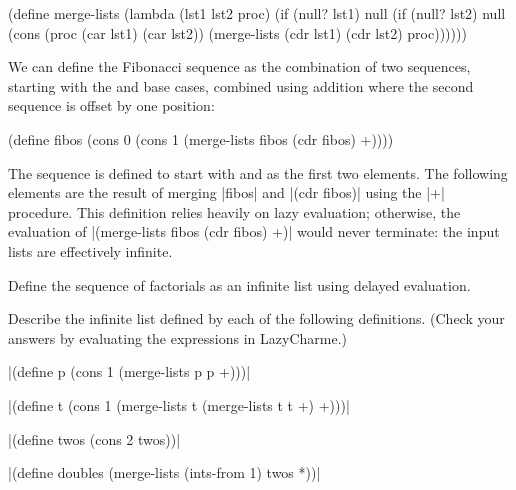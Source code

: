 \begin{schemeregion}
\begin{schemedisplay}
(define merge-lists
  (lambda (lst1 lst2 proc)
    (if (null? lst1) null
        (if (null? lst2) null
            (cons (proc (car lst1) (car lst2))
                  (merge-lists (cdr lst1) (cdr lst2) proc))))))
\end{schemedisplay}
We can define the Fibonacci sequence as the combination of two sequences, starting with the  and  base cases, combined using addition where the second sequence is offset by one position:
\begin{schemedisplay}
(define fibos (cons 0 (cons 1 (merge-lists fibos (cdr fibos) +))))
\end{schemedisplay}
The sequence is defined to start with  and  as the first two elements.  The following elements are the result of merging \scheme|fibos| and \scheme|(cdr fibos)| using the \scheme|+| procedure.  This definition relies heavily on lazy evaluation; otherwise, the evaluation of \scheme|(merge-lists fibos (cdr fibos) +)| would never terminate: the input lists are effectively infinite.

\beforeex
\begin{exercise}
Define the sequence of factorials as an infinite list using delayed evaluation.
\solution{\LATER{}}
\end{exercise}
\afterex

\beforeex
\begin{exercise}
Describe the infinite list defined by each of the following definitions.  (Check your answers by evaluating the expressions in LazyCharme.)
\begin{subexerciselist}
\item \scheme|(define p (cons 1 (merge-lists p p +)))|
\solution{\LATER{}}
\item \scheme|(define t (cons 1 (merge-lists t (merge-lists t t +) +)))|
\solution{\LATER{}}
\item \scheme|(define twos (cons 2 twos))|
\solution{\LATER{}}
\item \scheme|(define doubles (merge-lists (ints-from 1) twos *))|
\solution{\LATER{}}
\end{subexerciselist}
\end{exercise}
\afterex


\end{schemeregion}
